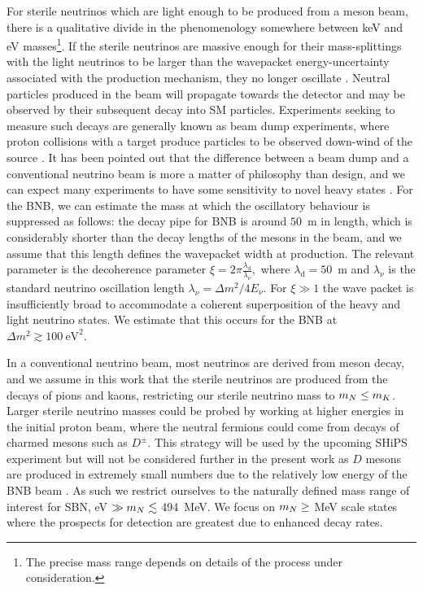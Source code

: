 \documentclass[11pt, a4paper]{article}
\def\ster{\ensuremath N}
\begin{document}
For sterile neutrinos which are light enough to be produced from a meson beam,
there is a qualitative divide in the phenomenology somewhere between keV and eV
masses\footnote{The precise mass range depends on details of the process under
consideration.}. If the sterile neutrinos are massive enough for their
mass-splittings with the light neutrinos to be larger than the wavepacket
energy-uncertainty associated with the production mechanism, they no longer
oscillate \cite{Akhmedov:2009rb}.  
%
%
Neutral particles produced in the beam will propagate towards the detector and
may be observed by their subsequent decay into SM particles. Experiments
seeking to measure such decays are generally known as beam dump experiments,
where proton collisions with a target produce particles to be observed
down-wind of the source \cite{CooperSarkar:1985nh, Bergsma:1985is,
Vaitaitis:1999wq, Bernardi:1985ny, Bernardi:1987ek, Anelli:2015pba,
Alekhin:2015byh}. It has been pointed out that the difference between a beam
dump and a conventional neutrino beam is more a matter of philosophy than
design, and we can expect many experiments to have some sensitivity to novel
heavy states \cite{Gorbunov:2007ak, Asaka:2012bb, Adams:2013qkq}. 
%
For the BNB, we can estimate the mass at which the oscillatory behaviour is
suppressed as follows: the decay pipe for BNB is around $50$~m in length, which
is considerably shorter than the decay lengths of the mesons in the beam, and
we assume that this length defines the wavepacket width at production.  The
relevant parameter is the decoherence parameter \cite{Akhmedov:2009rb,
Hernandez:2011rs}
%
$\xi = 2\pi \frac{\lambda_\text{d}}{\lambda_\nu},$
%
where $\lambda_\text{d} = 50$~m and $\lambda_\nu$ is the standard neutrino
oscillation length $\lambda_\nu = \Delta m^2/4E_\nu$. For $\xi\gg1$ the wave
packet is insufficiently broad to accommodate a coherent superposition of the
heavy and light neutrino states. We estimate that this occurs for the BNB at 
%
$ \Delta m^2 \gtrsim 100~\text{eV}^2.$
%

In a conventional neutrino beam, most neutrinos are derived from meson decay,
and we assume in this work that the sterile neutrinos are produced from the
decays of pions and kaons, restricting our sterile neutrino mass to $m_\ster \le m_K$.
%
Larger sterile neutrino masses could be probed by working at higher energies in the
initial proton beam, where the neutral fermions could come from decays of
charmed mesons such as $D^\pm$. This strategy will be used by the upcoming
SHiPS experiment \cite{Alekhin:2015byh, Anelli:2015pba} but will not be
considered further in the present work as $D$ mesons are produced in extremely
small numbers due to the relatively low energy of the BNB beam
\cite{AguilarArevalo:2008yp}. As such we restrict ourselves to the naturally
defined mass range of interest for SBN, eV $\gg m_\ster \lesssim$ 494~MeV.  We
focus on $m_\ster \geq$ MeV scale states where the prospects for detection are
greatest due to enhanced decay rates.
\end{document}
